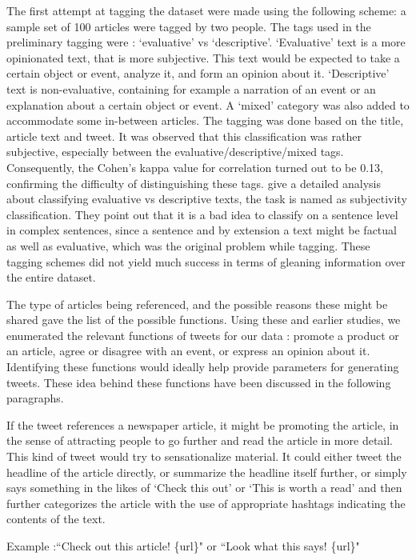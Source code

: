 The first attempt at tagging the dataset were made using the following scheme: a sample set of 100 articles were tagged by two people. The tags used in the preliminary tagging were : `evaluative' vs `descriptive'. `Evaluative' text is a more opinionated text, that is more subjective. This text would be expected to take a certain object or event, analyze it,  and form an opinion about it. `Descriptive' text is non-evaluative, containing for example a narration of an event or an explanation about a certain object or event. A `mixed' category was also added to accommodate some in-between articles. The tagging was done based on the title, article text and tweet. It was observed that this classification was rather subjective, especially between the evaluative/descriptive/mixed tags. Consequently, the Cohen's kappa \citep{kohen1960coefficient} value for correlation turned out to be 0.13, confirming the difficulty of distinguishing these tags. \cite{liu2012survey} give a detailed analysis about classifying evaluative vs descriptive texts, the task is named as subjectivity classification. They point out that it is a bad idea to classify on a sentence level in complex sentences, since a sentence and by extension a text might be factual as well as evaluative, which was the original problem while tagging. These tagging schemes did not yield much success in terms of gleaning information over the entire dataset.

The type of articles being referenced, and the possible reasons these might be shared gave the list of the possible functions. Using these and earlier studies, we enumerated the relevant functions of tweets for our data : promote a product or an article, agree or disagree with an event, or express an opinion about it. Identifying these functions would ideally help provide parameters for generating tweets. These idea behind these functions have been discussed in the following paragraphs. 

If the tweet references a newspaper article, it might be promoting the article, in the sense of attracting people to go further and read the article in more detail. This kind of tweet would try to sensationalize material. It could either tweet the headline of the article directly, or summarize the headline itself further, or simply says something in the likes of `Check this out' or `This is worth a read' and then further categorizes the article with the use of appropriate hashtags indicating the contents of the text.

Example :``Check out this article! \{url\}" or ``Look what this says! \{url\}"

